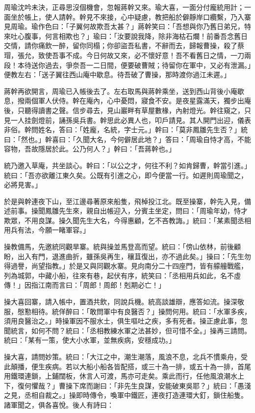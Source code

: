 周瑜沈吟未決，正尋思沒個機會，忽報蔣幹又來。瑜大喜，一面分付龐統用計；一面坐於帳上，使人請幹。幹見不來接，心中疑慮，教把船於僻靜岸口纜繫，乃入寨見周瑜。瑜作色曰：「子翼何故欺吾太甚？」蔣幹笑曰：「吾想與你乃舊日弟兄，特來吐心腹事，何言相欺也？」瑜曰：「汝要說我降，除非海枯石爛！前番吾念舊日交情，請你痛飲一醉，留你同榻；你卻盜吾私書，不辭而去，歸報曹操，殺了蔡瑁，張允，致使吾事不成。今日何故又來，必不懷好意！吾不看舊日之情，一刀兩段！本待送你過去，爭奈吾一二日間，便要破曹賊；待留你在軍中，又必有泄漏。」便教左右：「送子翼往西山庵中歇息。待吾破了曹操，那時渡你過江未遲。」

蔣幹再欲開言，周瑜已入帳後去了。左右取馬與蔣幹乘坐，送到西山背後小庵歇息，撥兩個軍人伏侍。幹在庵內，心中憂悶，寢食不安。是夜星露滿天，獨步出庵後，只聽得讀書之聲。信步尋去，見山巖畔有草屋數椽，內射燈光。幹往窺之，只見一人挂劍燈前，誦孫吳兵書。幹思此必異人也，叩戶請見。其人開門出迎，儀表非俗。幹問姓名，答曰：「姓龐，名統，字士元。」幹曰：「莫非鳳雛先生否？」統曰：「然也。」幹喜曰：「久聞大名，今何僻居此地？」答曰：「周瑜自恃才高，不能容物，吾故隱居於此。公乃何人？」幹曰：「吾蔣幹也。」

統乃邀入草庵，共坐談心。幹曰：「以公之才，何往不利？如肯歸曹，幹當引進。」統曰：「吾亦欲離江東久矣。公既有引進之心，即今便當一行。如遲則周瑜聞之，必將見害。」

於是與幹連夜下山，至江邊尋著原來船隻，飛棹投江北。既至操寨，幹先入見，備述前事。操聞鳳雛先生來，親自出帳迎入，分賓主坐定，問曰：「周瑜年幼，恃才欺眾，不用良謀。操久聞先生大名，今得惠顧，乞不吝教誨。」統曰：「某素聞丞相用兵有法，今願一睹軍容。」

操教備馬，先邀統同觀旱寨。統與操並馬登高而望。統曰：「傍山依林，前後顧盼，出入有門，退進曲折，雖孫吳再生，穰苴復出，亦不過此矣。」操曰：「先生勿得過譽，尚望指教。」於是又與同觀水寨。見向南分二十四座門，皆有艨艟戰艦，列為城郭，中藏小船，往來有巷，起伏有序，統笑曰：「丞相用兵如此，名不虛傳！」因指江南而言曰：「周郎！周郎！剋期必亡！」

操大喜回寨，請入帳中，置酒共飲，同說兵機。統高談雄辯，應答如流。操深敬服，慇懃相待。統佯醉曰：「敢問軍中有良醫否？」操問何用。統曰：「水軍多疾，須用良醫治之。」時操軍因不服水土，俱生嘔吐之疾，多有死者。操正慮此事，忽聞統言，如何不問？統曰：「丞相教練水軍之法甚妙，但可惜不全。」操再三請問。統曰：「某有一策，使大小水軍，並無疾病，安穩成功。」

操大喜，請問妙策。統曰：「大江之中，潮生潮落，風浪不息，北兵不慣乘舟，受此顛播，便生疾病。若以大船小船各皆配搭，或三十為一排，或五十為一排，首尾用鐵環連鎖，上鋪闊板，休言人可渡，馬亦可走矣。乘此而行，任他風浪潮水上下，復何懼哉？」曹操下席而謝曰：「非先生良謀，安能破東吳耶？」統曰：「愚淺之見，丞相自裁之。」操即時傳令，喚軍中鐵匠，連夜打造連環大釘，鎖住船隻。諸軍聞之，俱各喜悅。後人有詩曰：

